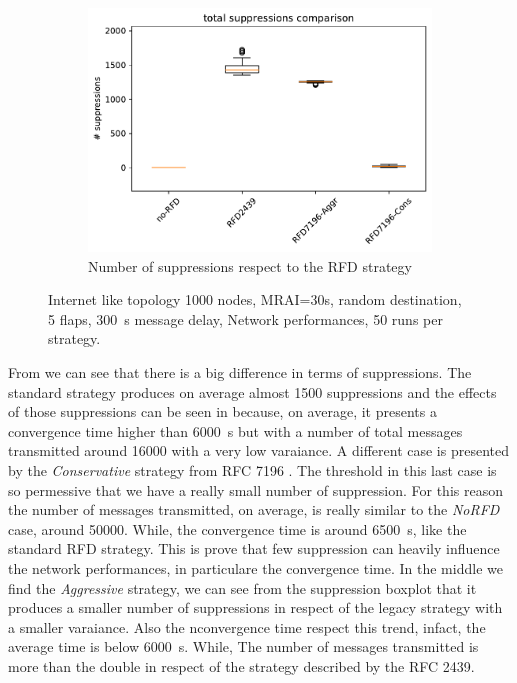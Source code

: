 \begin{figure}[h]
     \hfill
     \begin{subfigure}[b]{0.325\textwidth}
         \centering
         \includegraphics[width=\textwidth]{images/RFD/miceVSelephants/mice/cisco_1000MRAI30_rfd_comparison_suppressions_boxplot.pdf}
         \caption{Number of suppressions respect to the RFD strategy}
         \label{fig:1000_RFD_MRAI30_mice_suppressions}
     \end{subfigure}
		\caption{Internet like topology 1000 nodes, MRAI=30s, random destination, 
		5 flaps, \SI{300}{\second} message delay, Network performances,
		\num{50} runs per strategy.}
        \label{fig:1000_RFD_MRAI30_mice}
\end{figure}

From  we can see that there is a
big difference in terms of suppressions.
The standard strategy produces on average almost \num{1500} suppressions and the effects
of those suppressions can be seen in 
because, on average, it presents a convergence time higher than \SI{6000}{\second} 
but with a number of total messages transmitted around \num{16000} with a very 
low varaiance.
A different case is presented by the \textit{Conservative} strategy from \ac{RFC}
7196 \cite{rfc7196}.
The threshold in this last case is so permessive that we have a really small 
number of suppression.
For this reason the number of messages transmitted, on average, is really similar to 
the \textit{NoRFD} case, around \num{50000}.
While, the convergence time is around \SI{6500}{\second}, like the standard \ac{RFD}
strategy.
This is prove that few suppression can heavily influence the network performances,
in particulare the convergence time.
In the middle we find the \textit{Aggressive} strategy, we can see from the
suppression boxplot that it produces a smaller number of suppressions in respect
of the legacy strategy with a smaller varaiance.
Also the nconvergence time respect this trend, infact, the average time is 
below \SI{6000}{\second}.
While, The number of messages transmitted is more than the double in respect
of the strategy described by the \ac{RFC} \num{2439}.

